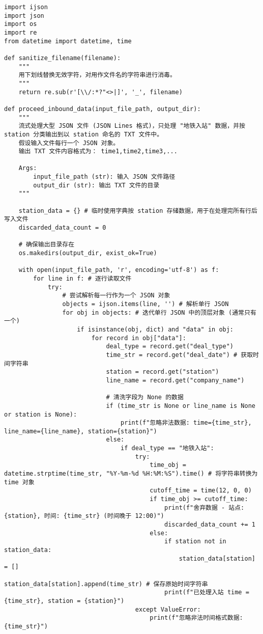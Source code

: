 \begin{lstlisting}[caption={处理和清洗入站数据}]
import ijson
import json
import os
import re
from datetime import datetime, time

def sanitize_filename(filename):
    """
    用下划线替换无效字符，对用作文件名的字符串进行消毒。
    """
    return re.sub(r'[\\/:*?"<>|]', '_', filename)

def proceed_inbound_data(input_file_path, output_dir):
    """
    流式处理大型 JSON 文件 (JSON Lines 格式)，只处理 "地铁入站" 数据，并按 station 分类输出到以 station 命名的 TXT 文件中。
    假设输入文件每行一个 JSON 对象。
    输出 TXT 文件内容格式为： time1,time2,time3,...

    Args:
        input_file_path (str): 输入 JSON 文件路径
        output_dir (str): 输出 TXT 文件的目录
    """

    station_data = {} # 临时使用字典按 station 存储数据，用于在处理完所有行后写入文件
    discarded_data_count = 0

    # 确保输出目录存在
    os.makedirs(output_dir, exist_ok=True)

    with open(input_file_path, 'r', encoding='utf-8') as f:
        for line in f: # 逐行读取文件
            try:
                # 尝试解析每一行作为一个 JSON 对象
                objects = ijson.items(line, '') # 解析单行 JSON
                for obj in objects: # 迭代单行 JSON 中的顶层对象 (通常只有一个)
                    if isinstance(obj, dict) and "data" in obj:
                        for record in obj["data"]:
                            deal_type = record.get("deal_type")
                            time_str = record.get("deal_date") # 获取时间字符串
                            station = record.get("station")
                            line_name = record.get("company_name")

                            # 清洗字段为 None 的数据
                            if (time_str is None or line_name is None or station is None):
                                print(f"忽略非法数据: time={time_str}, line_name={line_name}, station={station}")
                            else:
                                if deal_type == "地铁入站":
                                    try:
                                        time_obj = datetime.strptime(time_str, "%Y-%m-%d %H:%M:%S").time() # 将字符串转换为 time 对象
                                        cutoff_time = time(12, 0, 0)
                                        if time_obj >= cutoff_time:
                                            print(f"舍弃数据 - 站点: {station}, 时间: {time_str} (时间晚于 12:00)")
                                            discarded_data_count += 1
                                        else:
                                            if station not in station_data:
                                                station_data[station] = []
                                            station_data[station].append(time_str) # 保存原始时间字符串
                                            print(f"已处理入站 time = {time_str}, station = {station}")
                                    except ValueError:
                                        print(f"忽略非法时间格式数据: {time_str}")


\end{lstlisting}
